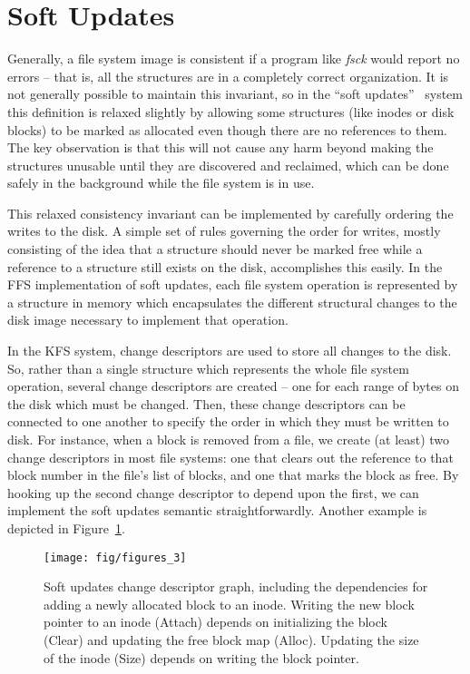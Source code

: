 \section {Soft Updates}
\label{sec:softupdate}

Generally, a file system image is consistent if a program like \emph{fsck}
would report no errors -- that is, all the structures are in a completely
correct organization. It is not generally possible to maintain this invariant,
so in the ``soft updates''~\cite{ganger00soft} system this definition is
relaxed slightly by allowing some structures (like inodes or disk blocks) to be
marked as allocated even though there are no references to them. The key
observation is that this will not cause any harm beyond making the structures
unusable until they are discovered and reclaimed, which can be done safely in
the background while the file system is in use.

This relaxed consistency invariant can be implemented by carefully ordering the
writes to the disk. A simple set of rules governing the order for writes,
mostly consisting of the idea that a structure should never be marked free
while a reference to a structure still exists on the disk, accomplishes this
easily. In the FFS implementation of soft updates, each file system operation
is represented by a structure in memory which encapsulates the different
structural changes to the disk image necessary to implement that operation.

In the KFS system, change descriptors are used to store all changes to the
disk. So, rather than a single structure which represents the whole file system
operation, several change descriptors are created -- one for each range of
bytes on the disk which must be changed. Then, these change descriptors can be
connected to one another to specify the order in which they must be written to
disk. For instance, when a block is removed from a file, we create (at least)
two change descriptors in most file systems: one that clears out the reference
to that block number in the file's list of blocks, and one that marks the block
as free.  By hooking up the second change descriptor to depend upon the first,
we can implement the soft updates semantic straightforwardly. Another example
is depicted in Figure~\ref{fig:softupdate}.

\begin{figure}[htb]
  \centering
  \texttt{[image: fig/figures\_3]}
  \caption{\label{fig:softupdate} Soft updates change descriptor graph,
  including the dependencies for adding a newly allocated block to an
  inode. Writing the new block pointer to an inode (Attach) depends on
  initializing the block (Clear) and updating the free block map (Alloc).
  Updating the size of the inode (Size) depends on writing the block
  pointer.}
\end{figure}

